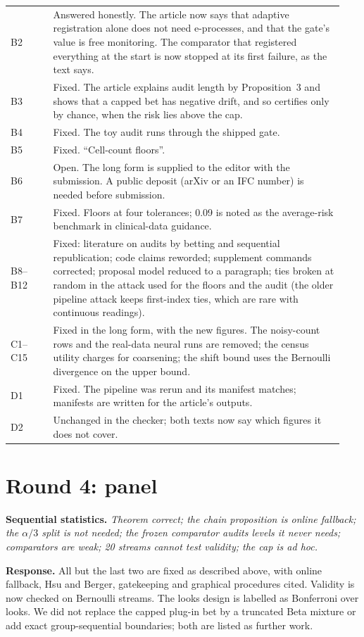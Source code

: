 \documentclass[11pt,a4paper]{article}
\newcommand{\point}[2]{\par\medskip\textbf{#1} \emph{#2}\par}
\newcommand{\reply}{\textbf{Response.} }
\begin{document}
\begin{longtable}{p{0.12\linewidth}p{0.82\linewidth}}
B2 & Answered honestly. The article now says that adaptive registration alone does not need e-processes, and that the gate's value is free monitoring. The comparator that registered everything at the start is now stopped at its first failure, as the text says.\\
B3 & Fixed. The article explains audit length by Proposition~3 and shows that a capped bet has negative drift, and so certifies only by chance, when the risk lies above the cap.\\
B4 & Fixed. The toy audit runs through the shipped gate.\\
B5 & Fixed. ``Cell-count floors''.\\
B6 & Open. The long form is supplied to the editor with the submission. A public deposit (arXiv or an IFC number) is needed before submission.\\
B7 & Fixed. Floors at four tolerances; 0.09 is noted as the average-risk benchmark in clinical-data guidance.\\
B8--B12 & Fixed: literature on audits by betting and sequential republication; code claims reworded; supplement commands corrected; proposal model reduced to a paragraph; ties broken at random in the attack used for the floors and the audit (the older pipeline attack keeps first-index ties, which are rare with continuous readings).\\
C1--C15 & Fixed in the long form, with the new figures. The noisy-count rows and the real-data neural runs are removed; the census utility charges for coarsening; the shift bound uses the Bernoulli divergence on the upper bound.\\
D1 & Fixed. The pipeline was rerun and its manifest matches; manifests are written for the article's outputs.\\
D2 & Unchanged in the checker; both texts now say which figures it does not cover.\\\bottomrule
\end{longtable}

\section*{Round 4: panel}
\point{Sequential statistics.}{Theorem correct; the chain proposition is online fallback; the $\alpha/3$ split is not needed; the frozen comparator audits levels it never needs; comparators are weak; 20 streams cannot test validity; the cap is ad hoc.}
\reply All but the last two are fixed as described above, with online fallback, Hsu and Berger, gatekeeping and graphical procedures cited. Validity is now checked on Bernoulli streams. The looks design is labelled as Bonferroni over looks. We did not replace the capped plug-in bet by a truncated Beta mixture or add exact group-sequential boundaries; both are listed as further work.
\end{document}
